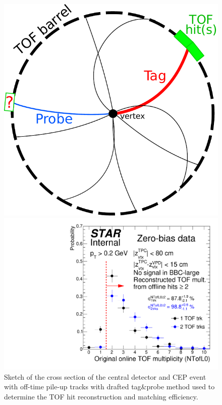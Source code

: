 \begin{figure}[b!]%
\centering%
\begin{minipage}{.4725\textwidth}%
  \centering%
  \includegraphics[width=0.98\linewidth]{graphics/correctionsToEff/TOF_tagAndProbe/sketch.pdf}%
  \caption[Sketch of the tag\&probe method.]%
  {Sketch of the cross section of the central detector and CEP event with off-time pile-up tracks with drafted tag\&probe method used to determine the TOF hit reconstruction and matching efficiency. }\label{fig:tagAndProbeSketch}
\end{minipage}%
\quad\quad%
\begin{minipage}{.4725\textwidth}%
  \centering%
  \includegraphics[width=\linewidth]{graphics/correctionsToEff/TOF_tagAndProbe/TofL0Eff_1TofVtx.pdf}%

\end{minipage}
\end{figure}
